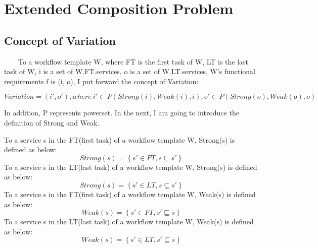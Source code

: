 \documentclass[senior,final,11pt]{iscs-thesis}
\begin{document}
\section{Extended Composition Problem} %

\subsection{Concept of Variation}



~~~~To a workflow template W,  where  FT is the first task of W, LT is the last task of W, i is a set of W.FT.services, o is a set of W.LT.services, W's functional requirements f is (i, o), I put forward the concept of Variation:

\[Variation = (i', o'), where~i' \subset P(Strong(i), Weak(i), i),  o' \subset P(Strong(o), Weak(o), o)\]

In addition, P represents powerset. In the next, I am going to introduce the definition of Strong and Weak.


To a service s in the FT(first task) of a workflow template W, Strong(s) is defined as below:
\[Strong(s) = \left\{s' \in FT, s \sqsubseteq s'\right\}\]
To a service s in the LT(last task) of a workflow template W, Strong(s) is defined as below:
\[Strong(s) = \left\{s' \in LT, s \subseteq s'\right\}\]
To a service s in the FT(first task) of a workflow template W, Weak(s) is defined as below:
\[Weak(s) = \left\{s' \in FT, s' \sqsubseteq s\right\}\]
To a service s in the LT(last task) of a workflow template W, Weak(s) is defined as below:
\[Weak(s) = \left\{s' \in LT, s' \subseteq s\right\}\]

\end{document}
